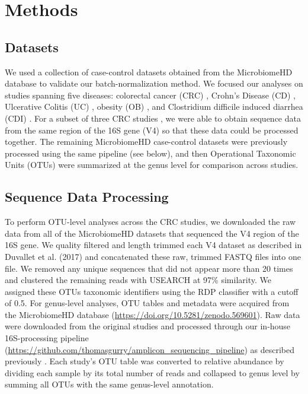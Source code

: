 \section{Methods}

\subsection{Datasets}

We used a collection of case-control datasets obtained from the MicrobiomeHD database \cite{17} to validate our batch-normalization method.
We focused our analyses on studies spanning five diseases: colorectal cancer (CRC) \cite{18,12,20,21}, Crohn's Disease (CD) \cite{22,23,24,25}, Ulcerative Colitis (UC) \cite{23,24,25}, obesity (OB) \cite{18, 26,27,28,29,30,31,32,33,34,35}, and Clostridium difficile induced diarrhea (CDI) \cite{33, 36}.
For a subset of three CRC studies \cite{18,19,20}, we were able to obtain sequence data from the same region of the 16S gene (V4) so that these data could be processed together.
The remaining MicrobiomeHD case-control datasets were previously processed using the same pipeline (see below), and then Operational Taxonomic Units (OTUs) were summarized at the genus level for comparison across studies.

\subsection{Sequence Data Processing}

To perform OTU-level analyses across the CRC studies, we downloaded the raw data from all of the MicrobiomeHD datasets that sequenced the V4 region of the 16S gene.
We quality filtered and length trimmed each V4 dataset as described in Duvallet et al. (2017) and concatenated these raw, trimmed FASTQ files into one file.
We removed any unique sequences that did not appear more than 20 times and clustered the remaining reads with USEARCH \cite{37} at 97\% similarity.
We assigned these OTUs taxonomic identifiers using the RDP classifier \cite{38} with a cutoff of 0.5.
For genus-level analyses, OTU tables and metadata were acquired from the MicrobiomeHD database (\url{https://doi.org/10.5281/zenodo.569601}).
Raw data were downloaded from the original studies and processed through our in-house 16S-processing pipeline (\url{https://github.com/thomasgurry/amplicon_sequencing_pipeline}) as described previously \cite{17}.
Each study's OTU table was converted to relative abundance by dividing each sample by its total number of reads and collapsed to genus level by summing all OTUs with the same genus-level annotation.

